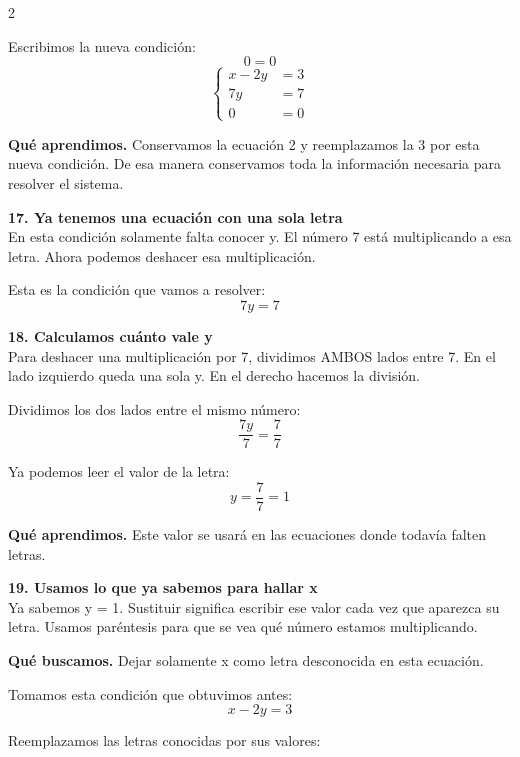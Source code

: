 \documentclass[11pt,a4paper,landscape]{article}
\begin{document}
\begin{multicols*}{2}
\begin{minipage}{\linewidth}
\par\smallskip Escribimos la nueva condición:
\[0 = 0\]
\[\left\{\begin{aligned}x - 2y &= 3\\7y &= 7\\0 &= 0\end{aligned}\right.\]
\par\smallskip\textbf{Qué aprendimos.} Conservamos la ecuación 2 y reemplazamos la 3 por esta nueva condición. De esa manera conservamos toda la información necesaria para resolver el sistema.
\end{minipage}\par\medskip
\noindent\begin{minipage}{\linewidth}\textbf{17. Ya tenemos una ecuación con una sola letra}\\[2pt]En esta condición solamente falta conocer y. El número 7 está multiplicando a esa letra. Ahora podemos deshacer esa multiplicación.
\par\smallskip Esta es la condición que vamos a resolver:
\[7y = 7\]
\end{minipage}\par\medskip
\noindent\begin{minipage}{\linewidth}\textbf{18. Calculamos cuánto vale y}\\[2pt]Para deshacer una multiplicación por 7, dividimos AMBOS lados entre 7. En el lado izquierdo queda una sola y. En el derecho hacemos la división.
\par\smallskip Dividimos los dos lados entre el mismo número:
\[\frac{7y}{7}=\frac{7}{7}\]
\par\smallskip Ya podemos leer el valor de la letra:
\[y=\frac{7}{7}=1\]
\par\smallskip\textbf{Qué aprendimos.} Este valor se usará en las ecuaciones donde todavía falten letras.
\end{minipage}\par\medskip
\noindent\begin{minipage}{\linewidth}\textbf{19. Usamos lo que ya sabemos para hallar x}\\[2pt]Ya sabemos y = 1. Sustituir significa escribir ese valor cada vez que aparezca su letra. Usamos paréntesis para que se vea qué número estamos multiplicando.
\par\smallskip\textbf{Qué buscamos.} Dejar solamente x como letra desconocida en esta ecuación.
\par\smallskip Tomamos esta condición que obtuvimos antes:
\[x - 2y = 3\]
\par\smallskip Reemplazamos las letras conocidas por sus valores:

\end{minipage}
\end{multicols*}
\end{document}
